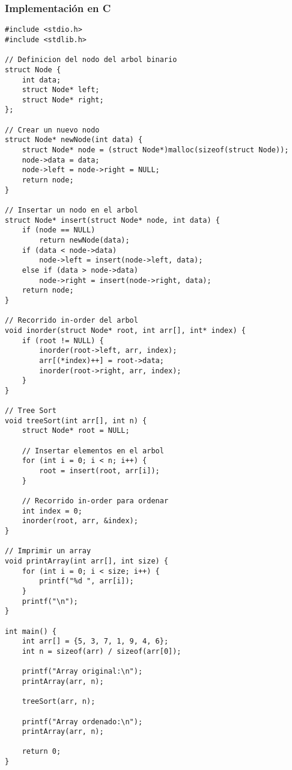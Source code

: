\documentclass[11pt,openany]{book}
\begin{document}
\subsubsection{Implementación en C}
\lstset{language=C}
\begin{lstlisting}
#include <stdio.h>
#include <stdlib.h>

// Definicion del nodo del arbol binario
struct Node {
    int data;
    struct Node* left;
    struct Node* right;
};

// Crear un nuevo nodo
struct Node* newNode(int data) {
    struct Node* node = (struct Node*)malloc(sizeof(struct Node));
    node->data = data;
    node->left = node->right = NULL;
    return node;
}

// Insertar un nodo en el arbol
struct Node* insert(struct Node* node, int data) {
    if (node == NULL)
        return newNode(data);
    if (data < node->data)
        node->left = insert(node->left, data);
    else if (data > node->data)
        node->right = insert(node->right, data);
    return node;
}

// Recorrido in-order del arbol
void inorder(struct Node* root, int arr[], int* index) {
    if (root != NULL) {
        inorder(root->left, arr, index);
        arr[(*index)++] = root->data;
        inorder(root->right, arr, index);
    }
}

// Tree Sort
void treeSort(int arr[], int n) {
    struct Node* root = NULL;

    // Insertar elementos en el arbol
    for (int i = 0; i < n; i++) {
        root = insert(root, arr[i]);
    }

    // Recorrido in-order para ordenar
    int index = 0;
    inorder(root, arr, &index);
}

// Imprimir un array
void printArray(int arr[], int size) {
    for (int i = 0; i < size; i++) {
        printf("%d ", arr[i]);
    }
    printf("\n");
}

int main() {
    int arr[] = {5, 3, 7, 1, 9, 4, 6};
    int n = sizeof(arr) / sizeof(arr[0]);

    printf("Array original:\n");
    printArray(arr, n);

    treeSort(arr, n);

    printf("Array ordenado:\n");
    printArray(arr, n);

    return 0;
}
\end{lstlisting}
\end{document}
